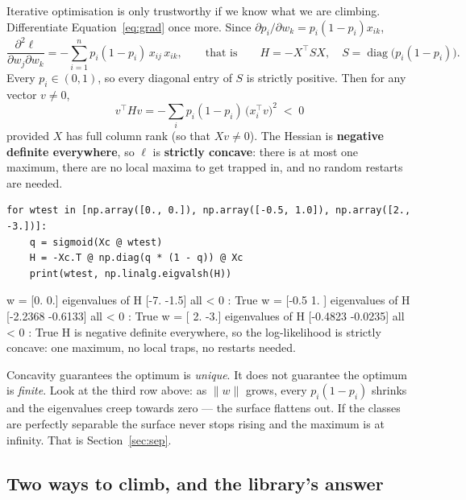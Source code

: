 \documentclass[11pt]{article}
\begin{document}
Iterative optimisation is only trustworthy if we know what we are climbing.
Differentiate Equation~\eqref{eq:grad} once more. Since
$\partial p_i/\partial w_k = p_i(1-p_i)x_{ik}$,
\begin{equation}
  \frac{\partial^2 \ell}{\partial w_j \partial w_k}
  = -\sum_{i=1}^{n} p_i(1 - p_i)\, x_{ij}\, x_{ik},
  \qquad\text{that is}\qquad
  H = -X^{\!\top} S X, \quad S = \operatorname{diag}\bigl(p_i(1-p_i)\bigr).
  \label{eq:hess}
\end{equation}
Every $p_i \in (0,1)$, so every diagonal entry of $S$ is strictly positive.
Then for any vector $v \neq 0$,
\[
  v^{\!\top} H v = -\sum_i p_i(1-p_i)\,\bigl(x_i^{\!\top}v\bigr)^{2} \;<\; 0
\]
provided $X$ has full column rank (so that $Xv \neq 0$). The Hessian is
\textbf{negative definite everywhere}, so $\ell$ is \textbf{strictly concave}:
there is at most one maximum, there are no local maxima to get trapped in, and
no random restarts are needed.

\begin{lstlisting}
for wtest in [np.array([0., 0.]), np.array([-0.5, 1.0]), np.array([2., -3.])]:
    q = sigmoid(Xc @ wtest)
    H = -Xc.T @ np.diag(q * (1 - q)) @ Xc
    print(wtest, np.linalg.eigvalsh(H))
\end{lstlisting}
\begin{codeout}
w = [0. 0.]        eigenvalues of H  [-7.  -1.5]         all < 0 : True
w = [-0.5  1. ]    eigenvalues of H  [-2.2368 -0.6133]   all < 0 : True
w = [ 2. -3.]      eigenvalues of H  [-0.4823 -0.0235]   all < 0 : True
H is negative definite everywhere, so the log-likelihood is strictly
concave: one maximum, no local traps, no restarts needed.
\end{codeout}

\begin{caution}
Concavity guarantees the optimum is \emph{unique}. It does not guarantee the
optimum is \emph{finite}. Look at the third row above: as $\lVert w \rVert$
grows, every $p_i(1-p_i)$ shrinks and the eigenvalues creep towards zero --- the
surface flattens out. If the classes are perfectly separable the surface
never stops rising and the maximum is at infinity. That is
Section~\ref{sec:sep}.
\end{caution}

\subsection{Two ways to climb, and the library's answer}
\label{sec:climb}
\end{document}
